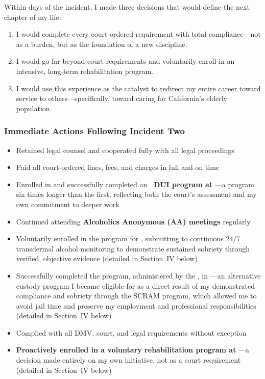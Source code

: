 Within days of the incident, I made three decisions that would define the next chapter of my life:

\begin{enumerate}[leftmargin=2em, itemsep=0.3em]
  \item I would complete every court-ordered requirement with total compliance---not as a burden, but as the foundation of a new discipline.
  \item I would go far beyond court requirements and voluntarily enroll in an intensive, long-term rehabilitation program.
  \item I would use this experience as the catalyst to redirect my entire career toward service to others---specifically, toward caring for California's elderly population.
\end{enumerate}

\subsubsection{Immediate Actions Following Incident Two}

\begin{itemize}[leftmargin=2em, itemsep=0.2em]
  \item Retained legal counsel and cooperated fully with all legal proceedings
  \item Paid all court-ordered fines, fees, and charges in full and on time
  \item Enrolled in and successfully completed an \textbf{\DUIProgramTwoDuration\ DUI program at \DUIProgramTwo}---a program six times longer than the first, reflecting both the court's assessment and my own commitment to deeper work
  \item Continued attending \textbf{Alcoholics Anonymous (AA) meetings} regularly
  \item Voluntarily enrolled in the \textbf{\SCRAMProgram} program for \SCRAMDuration, submitting to continuous 24/7 transdermal alcohol monitoring to demonstrate sustained sobriety through verified, objective evidence (detailed in Section~IV below)
  \item Successfully completed the \textbf{\CPACProgram} program, administered by the \CPACAdmin, in \CPACDuration---an alternative custody program I became eligible for as a direct result of my demonstrated compliance and sobriety through the SCRAM program, which allowed me to avoid jail time and preserve my employment and professional responsibilities (detailed in Section~IV below)
  \item Complied with all DMV, court, and legal requirements without exception
  \item \textbf{Proactively enrolled in a voluntary rehabilitation program at \RehabProgram}---a decision made entirely on my own initiative, not as a court requirement (detailed in Section~IV below)
\end{itemize}

